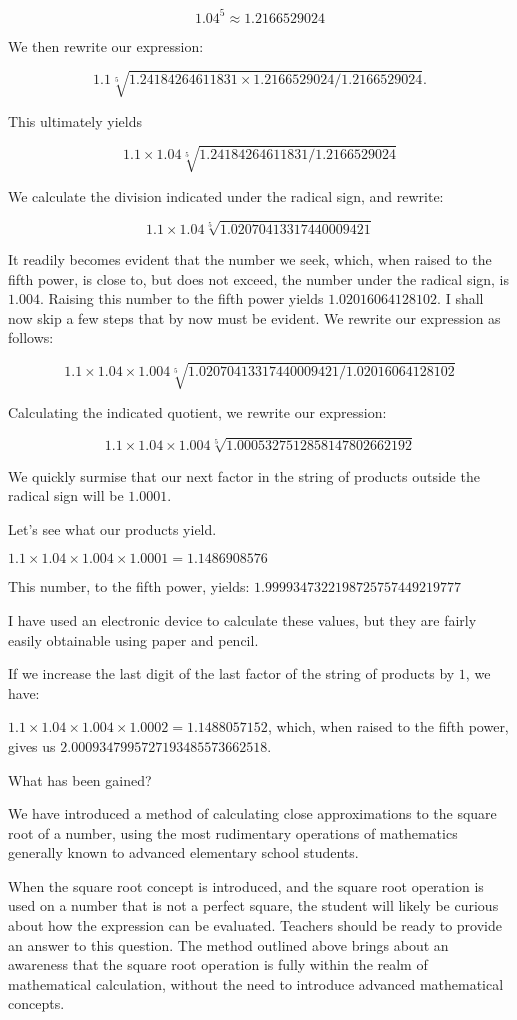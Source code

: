 \documentclass[12pt]{article}
\begin{document}
$$1.04  ^5 \approx 1.2166529024$$

We then rewrite our expression:

$$1.1  \sqrt[5]{1.24184264611831 \times 1.2166529024/1.2166529024}.$$

This ultimately yields 

$$1.1 \times 1.04   \sqrt[5]{1.24184264611831/1.2166529024}$$

We calculate the division indicated under the radical sign, and rewrite:

$$1.1 \times 1.04   \sqrt[5]{1.02070413317440009421}$$

It readily becomes evident that the number we seek, which, when raised to the fifth power, is close to, but does not exceed, the number under the radical sign, is $1.004$.  Raising this number to the fifth power yields $1.02016064128102$.  I shall now skip a few steps that by now must be evident. We rewrite our expression as follows:

$$1.1 \times 1.04 \times 1.004   \sqrt[5]{1.02070413317440009421/1.02016064128102}$$

Calculating the indicated quotient, we rewrite our expression:

$$1.1 \times 1.04 \times 1.004   \sqrt[5]{1.0005327512858147802662192}$$

We quickly surmise that our next factor in the string of products outside the radical sign will be $1.0001$.

Let’s see what our products yield.

$1.1 \times 1.04 \times 1.004 \times 1.0001 = 1.1486908576$

This number, to the fifth power, yields: $1.9999347322198725757449219777$

I have used an electronic device to calculate these values, but they are fairly easily obtainable using paper and pencil.

If we increase the last digit of the last factor of the string of products by $1$, we have:

$1.1 \times 1.04 \times 1.004 \times 1.0002 = 1.1488057152$, which, when raised to the fifth power, gives us $2.0009347995727193485573662518$.

What has been gained?

We have introduced a method of calculating close approximations to the square root of a number, using the most rudimentary operations of mathematics generally known to advanced elementary school students.

When the square root concept is introduced, and the square root operation is used on a number that is not a perfect square, the student will likely be curious about how the expression can be evaluated. Teachers should be ready to provide an answer to this question. The method outlined above brings about an awareness that the square root operation is fully within the realm of mathematical calculation, without the need to introduce advanced mathematical concepts.
\end{document}
